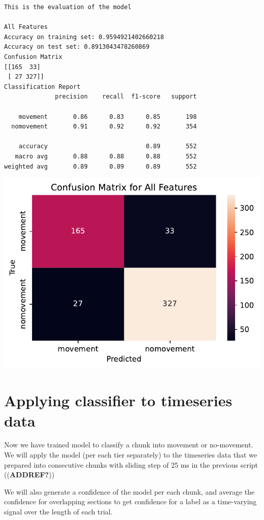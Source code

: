 \documentclass[
  letterpaper,
  DIV=11,
  numbers=noendperiod]{scrreprt}
\begin{document}
\begin{verbatim}
This is the evaluation of the model

All Features
Accuracy on training set: 0.9594921402660218
Accuracy on test set: 0.8913043478260869
Confusion Matrix
[[165  33]
 [ 27 327]]
Classification Report
              precision    recall  f1-score   support

    movement       0.86      0.83      0.85       198
  nomovement       0.91      0.92      0.92       354

    accuracy                           0.89       552
   macro avg       0.88      0.88      0.88       552
weighted avg       0.89      0.89      0.89       552
\end{verbatim}

\includegraphics{04_TS_movementAnnotation/02_MovementClassifier_final_files/figure-pdf/cell-7-output-2.pdf}


\chapter{Applying classifier to timeseries
data}\label{applying-classifier-to-timeseries-data}

Now we have trained model to classify a chunk into movement or
no-movement. We will apply the model (per each tier separately) to the
timeseries data that we prepared into consecutive chunks with sliding
step of 25 ms in the previous script ((\textbf{ADDREF?}))

We will also generate a confidence of the model per each chunk, and
average the confidence for overlapping sections to get confidence for a
label as a time-varying signal over the length of each trial.
\end{document}
